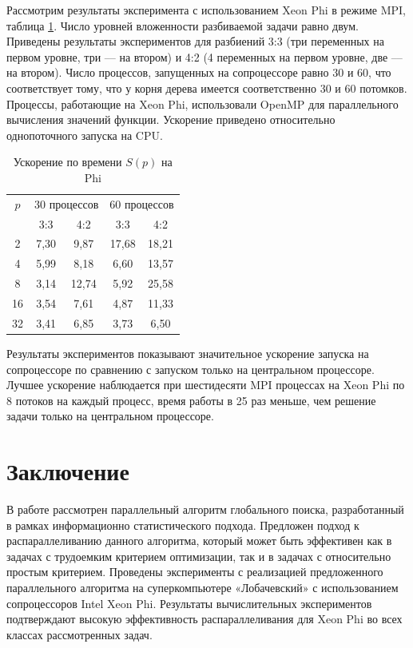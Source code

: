 \documentclass[a4paper]{article}
\begin{document}
\par
Рассмотрим результаты эксперимента с использованием Xeon Phi в режиме MPI, таблица \ref{table:time_speedUp_phi_2}. Число уровней вложенности разбиваемой задачи равно двум. Приведены результаты экспериментов для разбиений 3:3 (три переменных на первом уровне, три –-- на втором) и 4:2 (4 переменных на первом уровне, две –-- на втором). Число процессов, запущенных на сопроцессоре равно 30 и 60, что соответствует тому, что у корня дерева имеется соответственно 30 и 60 потомков. Процессы, работающие на Xeon Phi, использовали OpenMP для параллельного вычисления значений функции. Ускорение приведено относительно однопоточного запуска на CPU.
\begin{table}
    \centering
    \begin{tabular}{|c|c|c|c|c|}
    \hline
    \(p\) & \multicolumn{2}{|c|}{30 процессов} & \multicolumn{2}{|c|}{60 процессов}\\ \cline{2-5}
	& 3:3 & 4:2 & 3:3 & 4:2 \\ \hline
	2 & 7,30 & 9,87 & 17,68 & 18,21 \\ \hline
	4 & 5,99 & 8,18 & 6,60 & 13,57 \\ \hline
	8 & 3,14 & 12,74 & 5,92 & 25,58 \\ \hline
	16 & 3,54 & 7,61 & 4,87 & 11,33 \\ \hline
	32 & 3,41 & 6,85 & 3,73 & 6,50 \\ \hline
\end{tabular}
    \caption{Ускорение по времени \(S(p)\) на Phi}
    \label{table:time_speedUp_phi_2}
\end{table}
\par
Результаты экспериментов показывают значительное ускорение запуска на сопроцессоре по сравнению с запуском только на центральном процессоре. Лучшее ускорение наблюдается при шестидесяти MPI процессах на Xeon Phi по 8 потоков на каждый процесс, время работы в 25 раз меньше, чем решение задачи только на центральном процессоре.

\section{Заключение}
В работе рассмотрен параллельный алгоритм глобального поиска, разработанный в рамках информационно статистического подхода. Предложен подход к распараллеливанию данного алгоритма, который может быть эффективен как в задачах с трудоемким критерием оптимизации, так и в задачах с относительно простым критерием. Проведены эксперименты с реализацией предложенного параллельного алгоритма на суперкомпьютере «Лобачевский» с использованием сопроцессоров Intel Xeon Phi. Результаты вычислительных экспериментов подтверждают высокую эффективность распараллеливания для Xeon Phi во всех классах рассмотренных задач.
\end{document}
